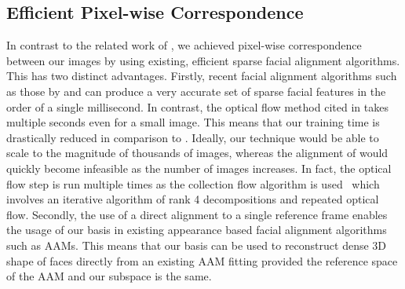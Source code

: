 \subsection{Efficient Pixel-wise Correspondence}\label{subsec:imag_coll_correspondence}
In contrast to the related work of \citet{KemelmacherShlizerman:2013iv},
we achieved pixel-wise correspondence between our images by using existing,
efficient sparse facial alignment algorithms. This has two distinct advantages.
Firstly, recent facial alignment algorithms such as those by
\citet{ren2014face} and \citet{kazemi2014one} can produce a very accurate set
of sparse facial features in the order of a single millisecond. In contrast, the
optical flow method cited in \citet{KemelmacherShlizerman:2013iv} takes multiple
seconds even for a small image. This means that our training time is drastically
reduced in comparison to \citet{KemelmacherShlizerman:2013iv}. 
Ideally, our technique would be able to scale
to the magnitude of thousands of images, whereas the alignment of
\citet{KemelmacherShlizerman:2013iv} would quickly become infeasible as the
number of images increases. In fact, the optical flow step is run multiple times as the
collection flow algorithm is used~\cite{kemelmacher2012collection} which involves an
iterative algorithm of rank 4 decompositions and repeated optical flow.
Secondly, the use of a direct alignment to a single reference frame enables
the usage of our basis in existing appearance based facial alignment algorithms
such as AAMs. This means that our basis can be used to reconstruct dense 3D
shape of faces directly from an existing AAM fitting provided the reference
space of the AAM and our subspace is the same.
